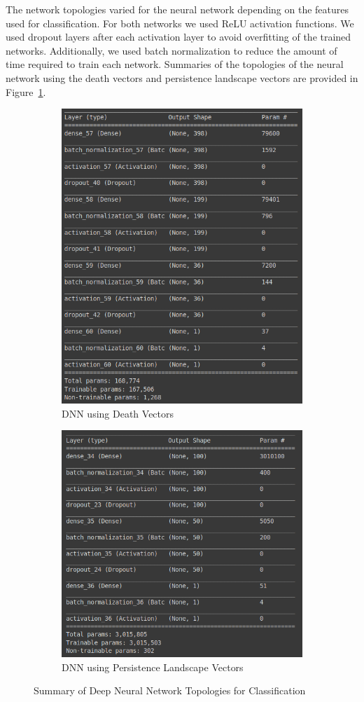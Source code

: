 \documentclass[11pt, reqno]{amsart}
\theoremstyle{plain}
\theoremstyle{definition}
\begin{document}
The network topologies varied for the neural network depending on the features used for classification. For both networks we used ReLU activation functions. We used dropout layers after each activation layer to avoid overfitting of the trained networks. Additionally, we used batch normalization to reduce the amount of time required to train each network. Summaries of the topologies of the neural network using the death vectors and persistence landscape vectors are provided in Figure~\ref{fig:DNN_Summary}.
\begin{figure}[H]
\centering
\begin{subfigure}{.5\textwidth}
  \centering
  \includegraphics[width=0.8\linewidth]{DV_DNN_Summary.png}
  \caption{DNN using Death Vectors}
\end{subfigure}%
\begin{subfigure}{.5\textwidth}
  \centering
  \includegraphics[width=0.8\linewidth]{PL_DNN_Summary.png}
  \caption{DNN using Persistence Landscape Vectors}
\end{subfigure}
\caption{Summary of Deep Neural Network Topologies for Classification}
\label{fig:DNN_Summary}
\end{figure}
\end{document}
